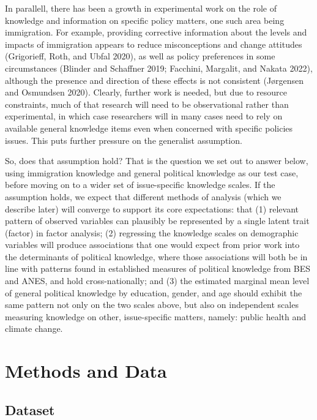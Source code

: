 \documentclass[11pt,halfline,a4paper,]{ouparticle}
\begin{document}
In parallell, there has been a growth in experimental work on the role
of knowledge and information on specific policy matters, one such area
being immigration. For example, providing corrective information about
the levels and impacts of immigration appears to reduce misconceptions
and change attitudes (Grigorieff, Roth, and Ubfal 2020), as well as
policy preferences in some circumstances (Blinder and Schaffner 2019;
Facchini, Margalit, and Nakata 2022), although the presence and
direction of these effects is not consistent (Jørgensen and Osmundsen
2020). Clearly, further work is needed, but due to resource constraints,
much of that research will need to be observational rather than
experimental, in which case researchers will in many cases need to rely
on available general knowledge items even when concerned with specific
policies issues. This puts further pressure on the generalist
assumption.

So, does that assumption hold? That is the question we set out to answer
below, using immigration knowledge and general political knowledge as
our test case, before moving on to a wider set of issue-specific
knowledge scales. If the assumption holds, we expect that different
methods of analysis (which we describe later) will converge to support
its core expectations: that (1) relevant pattern of observed variables
can plausibly be represented by a single latent trait (factor) in factor
analysis; (2) regressing the knowledge scales on demographic variables
will produce associations that one would expect from prior work into the
determinants of political knowledge, where those associations will both
be in line with patterns found in established measures of political
knowledge from BES and ANES, and hold cross-nationally; and (3) the
estimated marginal mean level of general political knowledge by
education, gender, and age should exhibit the same pattern not only on
the two scales above, but also on independent scales measuring knowledge
on other, issue-specific matters, namely: public health and climate
change.

\hypertarget{methods-and-data}{%
\section{Methods and Data}\label{methods-and-data}}

\hypertarget{dataset}{%
\subsection{Dataset}\label{dataset}}
\end{document}
